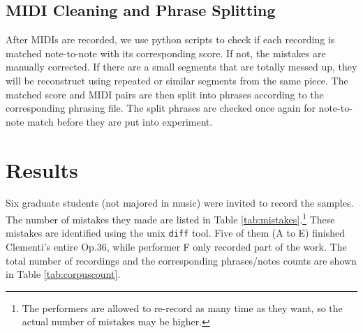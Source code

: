\subsection{MIDI Cleaning and Phrase Splitting}
  After MIDIs are recorded, we use python scripts to check if each recording is matched note-to-note with its corresponding score. If not, the mistakes are manually corrected. %
  If there are a small segments that are totally messed up, they will be reconstruct using repeated or similar segments from the same piece. The matched score and MIDI pairs are then split into phrases according to the corresponding phrasing file. The split phrases are checked once again for note-to-note match before they are put into experiment.

\section{Results}
Six graduate students (not majored in music) were invited to record the samples. The number of mistakes they made are listed in Table \ref{tab:mistakes}.\footnote{The performers are allowed to re-record as many time as they want, so the actual number of mistakes may be higher.} These mistakes are identified using the unix \texttt{diff}\cite{diff} tool. Five of them (A to E) finished Clementi's entire Op.36, while performer F only recorded part of the work. The total number of recordings and the corresponding phrases/notes counts are shown in Table \ref{tab:corpuscount}. 

